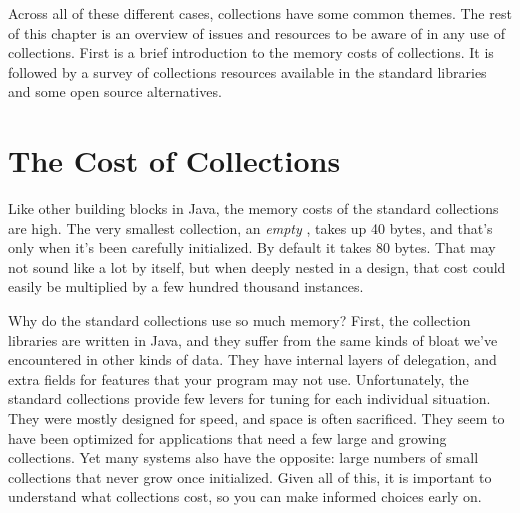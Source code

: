 Across all of these different cases, collections have some common themes.
The rest of this chapter is an overview of issues and resources to be aware of
in any use of collections. First is a brief
introduction to the memory costs of collections. It is followed by a
survey of collections resources available in the
standard libraries and some open source alternatives.

\section{The Cost of Collections}
\label{sec:designing-with-collections}

Like other building blocks in Java, the memory costs
of the standard collections are high. 
The very smallest collection, an \emph{empty}
, takes up 40 bytes, and that's only when it's been carefully
initialized. By default it takes 80 bytes. That may not sound like a lot by
itself, but when deeply nested in a design, that cost could easily be multiplied
by a few hundred thousand instances.  

Why do the standard collections use so much memory? 
First, the collection libraries are written in Java, and they
suffer from the same kinds of bloat we've encountered in other kinds of data.
They have internal layers of delegation, and extra fields for features that your program may not
use. Unfortunately, the standard collections provide few levers for
tuning for each individual situation. They were
mostly designed for speed, and space is often sacrificed. They seem
to have been optimized for applications that need a few large and growing
collections. Yet many systems also have the opposite: large numbers
of small collections that never grow once initialized. 
Given all of this, it is important to
understand what collections cost, so you can make
informed choices early on.



